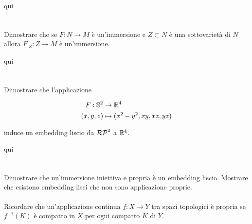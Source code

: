 qui

%

\newpage

%

\section{}\label{es2-22}

\begin{tcolorbox}
	Dimostrare che se $ F : N \to M $ è un'immersione e $ Z \subset N $ è una sottovarietà di $ N $ allora $ F_{|Z} : Z \to M $ è un'immersione.
\end{tcolorbox}

qui

%

\newpage

%

\section{}\label{es2-23}

\begin{tcolorbox}
	Dimostrare che l'applicazione
	
	\begin{align}
		\begin{split}
			F : \mathbb{S}^{2} &\to \mathbb{R}^{4}\\
			(x,y,z) &\mapsto (x^{2}-y^{2},xy,xz,yz)
		\end{split}
	\end{align}
	
	induce un embedding liscio da $ \mathcal{RP}^{2} $ a $ \mathbb{R}^{4} $.
\end{tcolorbox}

qui

%

\newpage

%

\section{}\label{es2-24}

\begin{tcolorbox}
	Dimostrare che un'immersione iniettiva e propria è un embedding liscio. Mostrare che esistono embedding lisci che non sono applicazione proprie.\\\\
	Ricordare che un'applicazione continua $ f : X \to Y $ tra spazi topologici è propria se $ f^{-1}(K) $ è compatto in $ X $ per ogni compatto $ K $ di $ Y $.
\end{tcolorbox}

